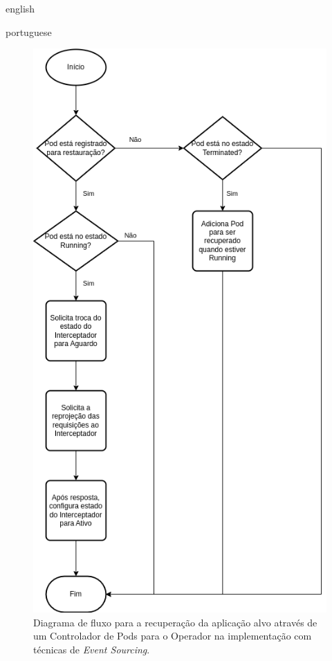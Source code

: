 \begin{otherlanguage*}{english}
\begin{otherlanguage*}{portuguese}
\begin{figure}[h]
\centering
\includegraphics[scale=0.46]{images/restore-pod.png}
\caption{Diagrama de fluxo para a recuperação da aplicação alvo através de um Controlador de Pods para o Operador na implementação com técnicas de \textit{Event Sourcing}.}
\label{fig:pod-controller-event-sourcing}
\end{figure}


\end{otherlanguage*}
\end{otherlanguage*}
